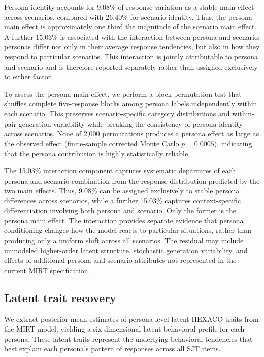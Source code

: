Persona identity accounts for 9.08\% of response variation as a stable main effect across scenarios, compared with 26.40\% for scenario identity. Thus, the persona main effect is approximately one third the magnitude of the scenario main effect. A further 15.03\% is associated with the interaction between persona and scenario: personas differ not only in their average response tendencies, but also in how they respond to particular scenarios. This interaction is jointly attributable to persona and scenario and is therefore reported separately rather than assigned exclusively to either factor.

To assess the persona main effect, we perform a block-permutation test that shuffles complete five-response blocks among persona labels independently within each scenario. This preserves scenario-specific category distributions and within-pair generation variability while breaking the consistency of persona identity across scenarios. None of 2{,}000 permutations produces a persona effect as large as the observed effect (finite-sample corrected Monte Carlo $p = 0.0005$), indicating that the persona contribution is highly statistically reliable.

The 15.03\% interaction component captures systematic departures of each persona and scenario combination from the response distribution predicted by the two main effects. Thus, 9.08\% can be assigned exclusively to stable persona differences across scenarios, while a further 15.03\% captures context-specific differentiation involving both persona and scenario. Only the former is the persona main effect. The interaction provides separate evidence that persona conditioning changes how the model reacts to particular situations, rather than producing only a uniform shift across all scenarios. The residual may include unmodeled higher-order latent structure, stochastic generation variability, and effects of additional persona and scenario attributes not represented in the current MIRT specification.

\subsection{Latent trait recovery}
\label{app:mirt_3}

We extract posterior mean estimates of persona-level latent HEXACO traits from the MIRT model, yielding a six-dimensional latent behavioral profile for each persona. These latent traits represent the underlying behavioral tendencies that best explain each persona's pattern of responses across all SJT items.

